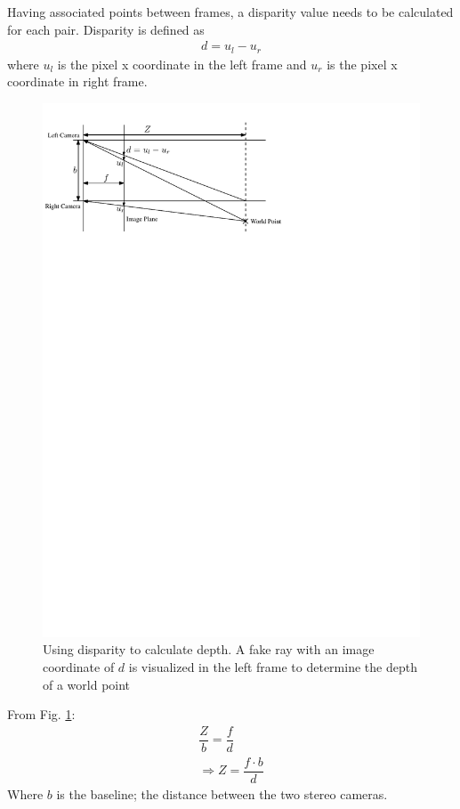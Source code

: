 Having associated points between frames, a disparity value needs to be calculated for each pair.  Disparity is defined as
\begin{align}
  d = u_l - u_r
\end{align}
where $u_l$ is the pixel x coordinate in the left frame and $u_r$ is the pixel x coordinate in right frame.
\begin{figure}[h]
  \centering
    \includegraphics[width=1.0\textwidth]{chapters/images/stereo_disparity}
  \caption{Using disparity to calculate depth.  A fake ray with an image coordinate of $d$ is visualized in the left frame to determine the depth of a world point}
  \label{fig:stereo_disparity}
\end{figure}


From Fig. \ref{fig:stereo_disparity}:
\begin{align}
  \dfrac{Z}{b} = \dfrac{f}{d}  \\  
   \Rightarrow Z = \dfrac{f \cdot b}{d}
\end{align}
Where $b$ is the baseline; the distance between the two stereo cameras.


